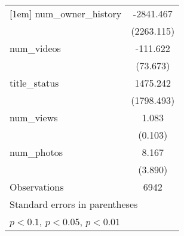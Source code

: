 {\begin{tabular}{l*{1}{c}}
[1em]
num\_owner\_history   &   -2841.467         \\
                    &  (2263.115)         \\
[1em]
num\_videos          &    -111.622         \\
                    &    (73.673)         \\
[1em]
title\_status        &    1475.242         \\
                    &  (1798.493)         \\
[1em]
num\_views           &       1.083\sym{***}\\
                    &     (0.103)         \\
[1em]
num\_photos          &       8.167\sym{**} \\
                    &     (3.890)         \\
\hline
Observations        &        6942         \\
\hline\hline
\multicolumn{2}{l}{\footnotesize Standard errors in parentheses}\\
\multicolumn{2}{l}{\footnotesize \sym{*} \(p<0.1\), \sym{**} \(p<0.05\), \sym{***} \(p<0.01\)}\\
\end{tabular}
}
